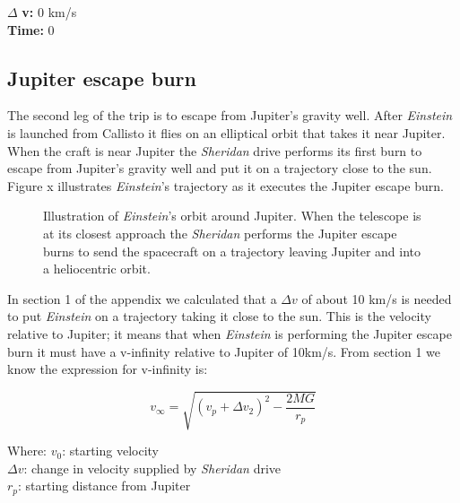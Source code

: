 \documentclass[12pt]{article} %
\begin{document}
$\Delta$ \textbf{v:} 0 km/s\\
\textbf{Time:} 0

\subsection{Jupiter escape burn}
The second leg of the trip is to escape from Jupiter's gravity well. After \textit{Einstein} is launched from Callisto it flies on an elliptical orbit that takes it near Jupiter. When the craft is near Jupiter the \textit{Sheridan} drive performs its first burn to escape from Jupiter's gravity well and put it on a trajectory close to the sun. Figure x illustrates \textit{Einstein}'s trajectory as it executes the Jupiter escape burn.

\begin{figure}[H]
	\caption{Illustration of \textit{Einstein}'s orbit around Jupiter. When the telescope is at its closest approach the \textit{Sheridan} performs the Jupiter escape burns to send the spacecraft on a trajectory leaving Jupiter and into a heliocentric orbit.}
\end{figure}

In section 1 of the appendix we calculated that a $\Delta v$ of about 10 km/s is needed to put \textit{Einstein} on a trajectory taking it close to the sun. This is the velocity relative to Jupiter; it means that when \textit{Einstein} is performing the Jupiter escape burn it must have a v-infinity relative to Jupiter of 10km/s. From section 1 we know the expression for v-infinity is:

$$v_{\infty} = \sqrt{(v_p + \Delta v_2)^2-\frac{2MG}{r_p}}$$

Where:
$v_0$: starting velocity\\
$\Delta v$: change in velocity supplied by \textit{Sheridan} drive\\
$r_p$: starting distance from Jupiter
\end{document}
